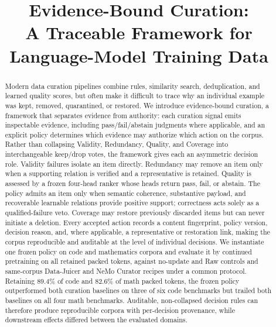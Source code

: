 \documentclass[conference]{IEEEtran}
\begin{document}
\title{Evidence-Bound Curation:\\
A Traceable Framework for Language-Model Training Data}

\author{
}

\maketitle

\begin{abstract}

Modern data curation pipelines combine rules, similarity search, deduplication, and learned quality scores, but often make it difficult to trace why an individual example was kept, removed, quarantined, or restored. We introduce evidence-bound curation, a framework that separates evidence from authority: each curation signal emits inspectable evidence, including pass/fail/abstain judgments where applicable, and an explicit policy determines which evidence may authorize which action on the corpus. Rather than collapsing Validity, Redundancy, Quality, and Coverage into interchangeable keep/drop votes, the framework gives each an asymmetric decision role. Validity failures isolate an item directly. Redundancy may remove an item only when a supporting relation is verified and a representative is retained. Quality is assessed by a frozen four-head ranker whose heads return pass, fail, or abstain. The policy admits an item only when semantic coherence, substantive payload, and recoverable learnable relations provide positive support; correctness acts solely as a qualified-failure veto. Coverage may restore previously discarded items but can never initiate a deletion. Every accepted action records a content fingerprint, policy version, decision reason, and, where applicable, a representative or restoration link, making the corpus reproducible and auditable at the level of individual decisions. We instantiate one frozen policy on code and mathematics corpora and evaluate it by continued pretraining on all retained packed tokens, against no-update and Raw controls and same-corpus Data-Juicer and NeMo Curator recipes under a common protocol. Retaining 89.4\% of code and 82.6\% of math packed tokens, the frozen policy outperformed both curation baselines on three of six code benchmarks but trailed both baselines on all four math benchmarks. Auditable, non-collapsed decision rules can therefore produce reproducible corpora with per-decision provenance, while downstream effects differed between the evaluated domains.

\end{abstract}
\end{document}

